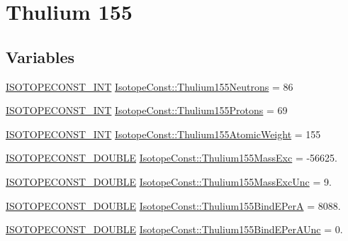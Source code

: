 \hypertarget{group___isotope_const-_thulium-_tm155}{}\section{Thulium 155}
\label{group___isotope_const-_thulium-_tm155}
\subsection*{Variables}
\begin{DoxyCompactItemize}
\item 
\mbox{\hyperlink{group___isotope_const-_macros_ga5f18360b3e99483a35c32d789e62621c}{I\+S\+O\+T\+O\+P\+E\+C\+O\+N\+S\+T\+\_\+\+I\+NT}} \mbox{\hyperlink{group___isotope_const-_thulium-_tm155_ga4f6553178326f322d60cb1f7bd0925b3}{Isotope\+Const\+::\+Thulium155\+Neutrons}} = 86
\item 
\mbox{\hyperlink{group___isotope_const-_macros_ga5f18360b3e99483a35c32d789e62621c}{I\+S\+O\+T\+O\+P\+E\+C\+O\+N\+S\+T\+\_\+\+I\+NT}} \mbox{\hyperlink{group___isotope_const-_thulium-_tm155_gaa769feb2b64c9afb19bd97a027c46e0a}{Isotope\+Const\+::\+Thulium155\+Protons}} = 69
\item 
\mbox{\hyperlink{group___isotope_const-_macros_ga5f18360b3e99483a35c32d789e62621c}{I\+S\+O\+T\+O\+P\+E\+C\+O\+N\+S\+T\+\_\+\+I\+NT}} \mbox{\hyperlink{group___isotope_const-_thulium-_tm155_ga81a98372e4bfd58c2d35619394049124}{Isotope\+Const\+::\+Thulium155\+Atomic\+Weight}} = 155
\item 
\mbox{\hyperlink{group___isotope_const-_macros_ga8f45a7272ce02c0b4c65c44636ed719a}{I\+S\+O\+T\+O\+P\+E\+C\+O\+N\+S\+T\+\_\+\+D\+O\+U\+B\+LE}} \mbox{\hyperlink{group___isotope_const-_thulium-_tm155_ga2e4ec52afc269a924f32245a04fc5eed}{Isotope\+Const\+::\+Thulium155\+Mass\+Exc}} = -\/56625.
\item 
\mbox{\hyperlink{group___isotope_const-_macros_ga8f45a7272ce02c0b4c65c44636ed719a}{I\+S\+O\+T\+O\+P\+E\+C\+O\+N\+S\+T\+\_\+\+D\+O\+U\+B\+LE}} \mbox{\hyperlink{group___isotope_const-_thulium-_tm155_ga7e2741ada22c26925047b5c8fb8404f6}{Isotope\+Const\+::\+Thulium155\+Mass\+Exc\+Unc}} = 9.
\item 
\mbox{\hyperlink{group___isotope_const-_macros_ga8f45a7272ce02c0b4c65c44636ed719a}{I\+S\+O\+T\+O\+P\+E\+C\+O\+N\+S\+T\+\_\+\+D\+O\+U\+B\+LE}} \mbox{\hyperlink{group___isotope_const-_thulium-_tm155_ga672b49926b127907a6a4b046da3edc80}{Isotope\+Const\+::\+Thulium155\+Bind\+E\+PerA}} = 8088.
\item 
\mbox{\hyperlink{group___isotope_const-_macros_ga8f45a7272ce02c0b4c65c44636ed719a}{I\+S\+O\+T\+O\+P\+E\+C\+O\+N\+S\+T\+\_\+\+D\+O\+U\+B\+LE}} \mbox{\hyperlink{group___isotope_const-_thulium-_tm155_ga154083bf45f85b866bf9e30e43d061d2}{Isotope\+Const\+::\+Thulium155\+Bind\+E\+Per\+A\+Unc}} = 0.

\end{DoxyCompactItemize}
